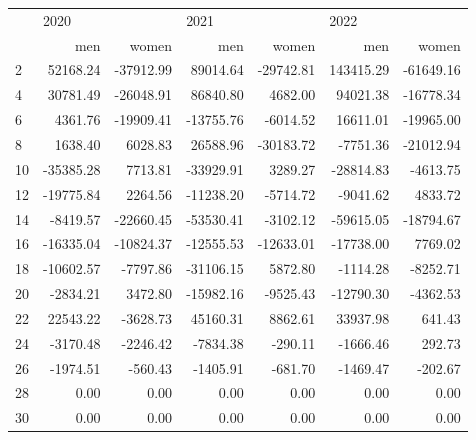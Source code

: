 \begin{tabular}{lrrrrrr}
\toprule
{} & \multicolumn{2}{l}{2020} & \multicolumn{2}{l}{2021} & \multicolumn{2}{l}{2022} \\
{} &       men &     women &       men &     women &        men &     women \\
\midrule
2  &  52168.24 & -37912.99 &  89014.64 & -29742.81 &  143415.29 & -61649.16 \\
4  &  30781.49 & -26048.91 &  86840.80 &   4682.00 &   94021.38 & -16778.34 \\
6  &   4361.76 & -19909.41 & -13755.76 &  -6014.52 &   16611.01 & -19965.00 \\
8  &   1638.40 &   6028.83 &  26588.96 & -30183.72 &   -7751.36 & -21012.94 \\
10 & -35385.28 &   7713.81 & -33929.91 &   3289.27 &  -28814.83 &  -4613.75 \\
12 & -19775.84 &   2264.56 & -11238.20 &  -5714.72 &   -9041.62 &   4833.72 \\
14 &  -8419.57 & -22660.45 & -53530.41 &  -3102.12 &  -59615.05 & -18794.67 \\
16 & -16335.04 & -10824.37 & -12555.53 & -12633.01 &  -17738.00 &   7769.02 \\
18 & -10602.57 &  -7797.86 & -31106.15 &   5872.80 &   -1114.28 &  -8252.71 \\
20 &  -2834.21 &   3472.80 & -15982.16 &  -9525.43 &  -12790.30 &  -4362.53 \\
22 &  22543.22 &  -3628.73 &  45160.31 &   8862.61 &   33937.98 &    641.43 \\
24 &  -3170.48 &  -2246.42 &  -7834.38 &   -290.11 &   -1666.46 &    292.73 \\
26 &  -1974.51 &   -560.43 &  -1405.91 &   -681.70 &   -1469.47 &   -202.67 \\
28 &      0.00 &      0.00 &      0.00 &      0.00 &       0.00 &      0.00 \\
30 &      0.00 &      0.00 &      0.00 &      0.00 &       0.00 &      0.00 \\
\bottomrule
\end{tabular}
